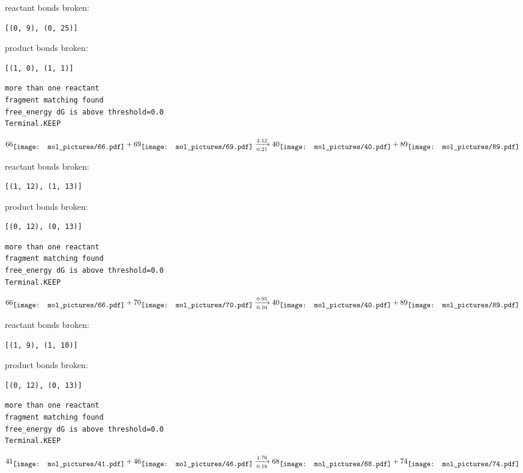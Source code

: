 \documentclass{article}
\begin{document}
reactant bonds broken:\begin{verbatim}
[(0, 9), (0, 25)]
\end{verbatim}
product bonds broken:\begin{verbatim}
[(1, 0), (1, 1)]
\end{verbatim}




\vspace{1cm}
\begin{verbatim}
more than one reactant
fragment matching found
free_energy dG is above threshold=0.0
Terminal.KEEP
\end{verbatim}
$$
66
\raisebox{-.5\height}{\texttt{[image: mol\_pictures/66.pdf]}}
+
69
\raisebox{-.5\height}{\texttt{[image: mol\_pictures/69.pdf]}}
\xrightarrow[0.21]{2.12}
40
\raisebox{-.5\height}{\texttt{[image: mol\_pictures/40.pdf]}}
+
89
\raisebox{-.5\height}{\texttt{[image: mol\_pictures/89.pdf]}}
$$


reactant bonds broken:\begin{verbatim}
[(1, 12), (1, 13)]
\end{verbatim}
product bonds broken:\begin{verbatim}
[(0, 12), (0, 13)]
\end{verbatim}




\vspace{1cm}
\begin{verbatim}
more than one reactant
fragment matching found
free_energy dG is above threshold=0.0
Terminal.KEEP
\end{verbatim}
$$
66
\raisebox{-.5\height}{\texttt{[image: mol\_pictures/66.pdf]}}
+
70
\raisebox{-.5\height}{\texttt{[image: mol\_pictures/70.pdf]}}
\xrightarrow[0.10]{0.95}
40
\raisebox{-.5\height}{\texttt{[image: mol\_pictures/40.pdf]}}
+
89
\raisebox{-.5\height}{\texttt{[image: mol\_pictures/89.pdf]}}
$$


reactant bonds broken:\begin{verbatim}
[(1, 9), (1, 10)]
\end{verbatim}
product bonds broken:\begin{verbatim}
[(0, 12), (0, 13)]
\end{verbatim}




\vspace{1cm}
\begin{verbatim}
more than one reactant
fragment matching found
free_energy dG is above threshold=0.0
Terminal.KEEP
\end{verbatim}
$$
41
\raisebox{-.5\height}{\texttt{[image: mol\_pictures/41.pdf]}}
+
46
\raisebox{-.5\height}{\texttt{[image: mol\_pictures/46.pdf]}}
\xrightarrow[0.18]{1.76}
68
\raisebox{-.5\height}{\texttt{[image: mol\_pictures/68.pdf]}}
+
74
\raisebox{-.5\height}{\texttt{[image: mol\_pictures/74.pdf]}}
$$
\end{document}
